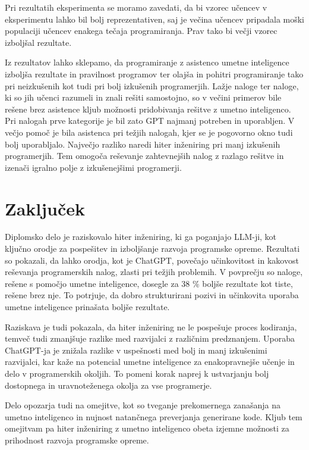 \documentclass[a4paper,12pt,openright]{book}
\begin{document}
Pri rezultatih eksperimenta se moramo zavedati, da bi vzorec učencev v eksperimentu lahko bil bolj reprezentativen, saj je večina učencev pripadala moški populaciji učencev enakega tečaja programiranja. Prav tako bi večji vzorec izboljšal rezultate.

Iz rezultatov lahko sklepamo, da programiranje z asistenco umetne inteligence izboljša rezultate in pravilnost programov ter olajša in pohitri programiranje tako pri neizkušenih kot tudi pri bolj izkušenih programerjih. Lažje naloge ter naloge, ki so jih učenci razumeli in znali rešiti samostojno, so v večini primerov bile rešene brez asistence kljub možnosti pridobivanja rešitve z umetno inteligenco. Pri nalogah prve kategorije je bil zato GPT najmanj potreben in uporabljen. V večjo pomoč je bila asistenca pri težjih nalogah, kjer se je pogovorno okno tudi bolj uporabljalo. Največjo razliko naredi hiter inženiring pri manj izkušenih programerjih. Tem omogoča reševanje zahtevnejših nalog z razlago rešitve in izenači igralno polje z izkušenejšimi programerji.

\pagebreak

\section{Zaključek}
Diplomsko delo je raziskovalo hiter inženiring, ki ga poganjajo LLM-ji, kot ključno orodje za pospešitev in izboljšanje razvoja programske opreme. Rezultati so pokazali, da lahko orodja, kot je ChatGPT, povečajo učinkovitost in kakovost reševanja programerskih nalog, zlasti pri težjih problemih. V povprečju so naloge, rešene s pomočjo umetne inteligence, dosegle za 38 \% boljše rezultate kot tiste, rešene brez nje. To potrjuje, da dobro strukturirani pozivi in učinkovita uporaba umetne inteligence prinašata boljše rezultate.

Raziskava je tudi pokazala, da hiter inženiring ne le pospešuje proces kodiranja, temveč tudi zmanjšuje razlike med razvijalci z različnim predznanjem. Uporaba ChatGPT-ja je znižala razlike v uspešnosti med bolj in manj izkušenimi razvijalci, kar kaže na potencial umetne inteligence za enakopravnejše učenje in delo v programerskih okoljih. To pomeni korak naprej k ustvarjanju bolj dostopnega in uravnoteženega okolja za vse programerje.

Delo opozarja tudi na omejitve, kot so tveganje prekomernega zanašanja na umetno inteligenco in nujnost natančnega preverjanja generirane kode. Kljub tem omejitvam pa hiter inženiring z umetno inteligenco obeta izjemne možnosti za prihodnost razvoja programske opreme.
\end{document}

